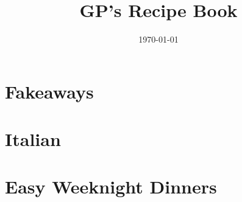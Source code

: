 \documentclass[13pt,a4paper]{book}
\begin{document}
\dominitoc %

\title{GP’s Recipe Book}
\date{\today}
\maketitle

\tableofcontents

\chapter{Fakeaways}
\minitoc
\newpage

\newpage

\newpage

\newpage

\newpage

\chapter{Italian}
\minitoc
\newpage

\newpage

\newpage

\newpage

\newpage

\newpage

\chapter{Easy Weeknight Dinners}
\minitoc
\newpage

\newpage

\newpage

\newpage

\newpage

\newpage

\newpage

\newpage

\newpage

\newpage

\newpage

\newpage

\newpage

\newpage

\newpage

\newpage

\newpage

\newpage

\newpage

\newpage

\newpage

\newpage

\newpage

\newpage

\newpage

\end{document}
